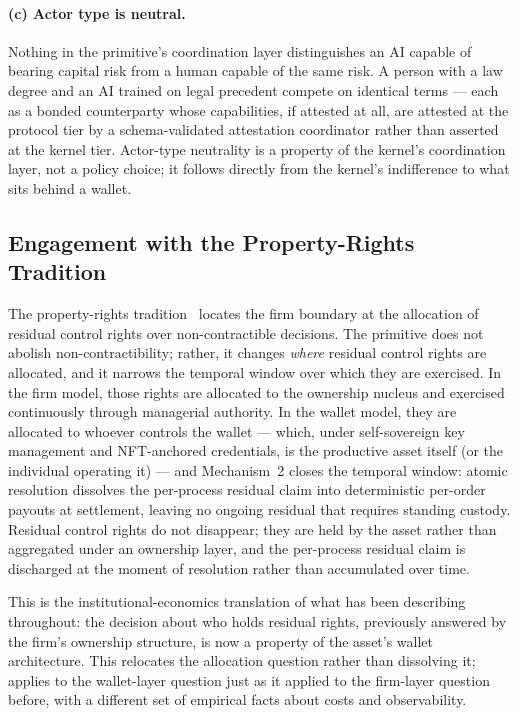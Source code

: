 \documentclass[11pt,a4paper]{article}
\theoremstyle{definition}
\theoremstyle{remark}
\begin{document}
\paragraph{(c) Actor type is neutral.}
Nothing in the primitive's coordination layer distinguishes an AI
capable of bearing capital risk from a human capable of the same
risk. A person with a law degree and an AI trained on legal
precedent compete on identical terms --- each as a bonded
counterparty whose capabilities, if attested at all, are attested
at the protocol tier by a schema-validated attestation coordinator
rather than asserted at the kernel tier. Actor-type neutrality is
a property of the kernel's coordination layer, not a policy
choice; it follows directly from the kernel's indifference to what
sits behind a wallet.

\subsection{Engagement with the Property-Rights Tradition}

The property-rights tradition~\citep{hart1995, grossman_hart_1986,
hart_moore_1990} locates the firm boundary at the allocation of
residual control rights over non-contractible decisions. The
primitive does not abolish non-contractibility; rather, it changes
\emph{where} residual control rights are allocated, and it
narrows the temporal window over which they are exercised. In the
firm model, those rights are allocated to the ownership nucleus and
exercised continuously through managerial authority. In the wallet
model, they are allocated to whoever controls the wallet ---
which, under self-sovereign key management and NFT-anchored
credentials, is the productive asset itself (or the individual
operating it) --- and Mechanism~2 closes the temporal window:
atomic resolution dissolves the per-process residual claim into
deterministic per-order payouts at settlement, leaving no
ongoing residual that requires standing custody. Residual control
rights do not disappear; they are held by the asset rather than
aggregated under an ownership layer, and the per-process residual
claim is discharged at the moment of resolution rather than
accumulated over time.

This is the institutional-economics translation of what
 has been describing throughout: the decision
about who holds residual rights, previously answered by the firm's
ownership structure, is now a property of the asset's wallet
architecture. This relocates the allocation question rather than
dissolving it; \citet{hart_moore_1990} applies to the wallet-layer
question just as it applied to the firm-layer question before,
with a different set of empirical facts about costs and
observability.
\end{document}
